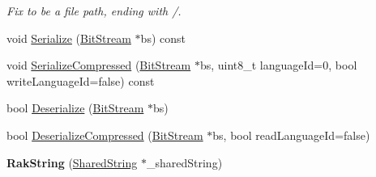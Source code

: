 \begin{DoxyCompactItemize}
\begin{DoxyCompactList}\small\item\em Fix to be a file path, ending with /. \end{DoxyCompactList}\item 
void \hyperlink{class_rak_net_1_1_rak_string_ab141de62e7f4618342a389b702029eba}{Serialize} (\hyperlink{class_rak_net_1_1_bit_stream}{Bit\-Stream} $\ast$bs) const 
\item 
void \hyperlink{class_rak_net_1_1_rak_string_ade41a2d6622841749ae0a6e51cb2cea9}{Serialize\-Compressed} (\hyperlink{class_rak_net_1_1_bit_stream}{Bit\-Stream} $\ast$bs, uint8\-\_\-t language\-Id=0, bool write\-Language\-Id=false) const 
\item 
bool \hyperlink{class_rak_net_1_1_rak_string_ab5bf3364843b0b354a28582e1b2f35d4}{Deserialize} (\hyperlink{class_rak_net_1_1_bit_stream}{Bit\-Stream} $\ast$bs)
\item 
bool \hyperlink{class_rak_net_1_1_rak_string_a8d30ae45770db0b21f15a0a58466cd8e}{Deserialize\-Compressed} (\hyperlink{class_rak_net_1_1_bit_stream}{Bit\-Stream} $\ast$bs, bool read\-Language\-Id=false)
\item 
\hypertarget{class_rak_net_1_1_rak_string_af989ab4d87f0d1ab14c83a3c02c5678c}{{\bfseries Rak\-String} (\hyperlink{struct_rak_net_1_1_rak_string_1_1_shared_string}{Shared\-String} $\ast$\-\_\-shared\-String)}\label{class_rak_net_1_1_rak_string_af989ab4d87f0d1ab14c83a3c02c5678c}

\end{DoxyCompactItemize}
